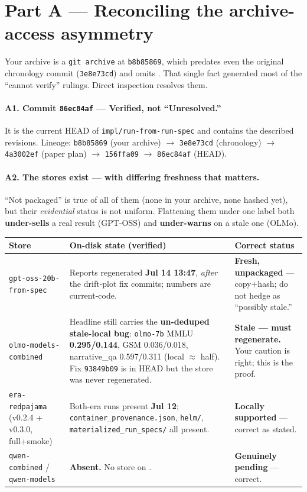 \documentclass[11pt]{article}
\newcommand{\code}[1]{\texttt{#1}}
\begin{document}
\section*{Part A --- Reconciling the archive-access asymmetry}

Your archive is a \code{git archive} at \code{b8b85869}, which predates even the
original chronology commit (\code{3e8e73cd}) and omits . That single fact
generated most of the ``cannot verify'' rulings. Direct inspection resolves them.

\paragraph{A1. Commit \code{86ec84af} --- Verified, not ``Unresolved.''} It is the
current HEAD of \code{impl/run-from-run-spec} and contains the described revisions.
Lineage: \code{b8b85869} (your archive) $\rightarrow$ \code{3e8e73cd} (chronology)
$\rightarrow$ \code{4a3002ef} (paper plan) $\rightarrow$ \code{156ffa09} $\rightarrow$
\code{86ec84af} (HEAD).

\paragraph{A2. The  stores exist --- with differing freshness that matters.}
``Not packaged'' is true of all of them (none in your archive, none hashed yet), but
their \emph{evidential} status is not uniform. Flattening them under one label both
\textbf{under-sells} a real result (GPT-OSS) and \textbf{under-warns} on a stale one
(OLMo).

\begin{longtable}{@{}P{0.20\textwidth}P{0.44\textwidth}P{0.28\textwidth}@{}}
\toprule
\textbf{Store} & \textbf{On-disk state (verified)} & \textbf{Correct status} \\
\midrule\endhead
\code{gpt-oss-20b-from-spec} & Reports regenerated \textbf{Jul 14 13:47}, \emph{after}
the drift-plot fix commits; numbers are current-code. & \textbf{Fresh, unpackaged} ---
copy+hash; do not hedge as ``possibly stale.'' \\
\code{olmo-models-combined} & Headline still carries the \textbf{un-deduped stale-local
bug}: \code{olmo-7b} MMLU \textbf{0.295/0.144}, GSM 0.036/0.018, narrative\_qa
0.597/0.311 (local $\approx$ half). Fix \code{93849b09} is in HEAD but the store was
never regenerated. & \textbf{Stale --- must regenerate.} Your caution is right; this is
the proof. \\
\code{era-redpajama} (v0.2.4 + v0.3.0, full+smoke) & Both-era runs present \textbf{Jul
12}; \code{container\_provenance.json}, \code{helm/}, \code{materialized\_run\_specs/}
all present. & \textbf{Locally supported} --- correct as stated. \\
\code{qwen-combined} / \code{qwen-models} & \textbf{Absent.} No store on . &
\textbf{Genuinely pending} --- correct. \\
\bottomrule
\end{longtable}
\end{document}
